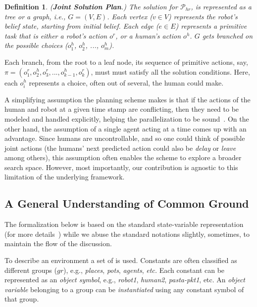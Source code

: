 \documentclass[letterpaper]{article} %
\newtheorem{definition}{Definition}
\begin{document}
\begin{definition} \label{def:joint-sol-plan}
(\textbf{Joint Solution Plan}.) 
{The solution for $\mathcal{P}_{hr}$, is represented as a tree or a graph, i.e., $G=(V,E)$. Each vertex ($v \in V$) represents the robot's belief state, starting from initial belief. Each edge ($e \in E$) represents a primitive task that is either a robot's action $o^{r}$, or a human's action $o^{h}$. $G$ gets branched on the possible choices ($o^{h}_1$, $o^{h}_2$, ..., $o^{h}_m$). 
}  
\end{definition}

Each branch, from the root to a leaf node, its sequence of primitive actions, say,  $\pi=(o_1^r,o_2^h,o_3^r,...,o_{k-1}^h,o_k^r)$, must must satisfy all the solution conditions. 
Here, each $o_i^h$ represents a choice, often out of several, the human could make.

A simplifying assumption the planning scheme makes is that if the actions of the human and robot at a given time stamp are conflicting, then they need to be modeled and handled explicitly, helping the parallelization to be sound~\cite{CrosbyJR14,ShekharB20}.
On the other hand, the assumption of a single agent acting at a time comes up with an advantage. Since humans are uncontrollable, and so one could think of possible joint actions (the humans' next predicted action could also be \textit{delay} or \textit{leave} among others), this assumption often enables the scheme to explore a broader search space. 
However, most importantly, our contribution is agnostic to this limitation of the underlying framework.

\subsection{A General Understanding of Common Ground}
The formalization below is based on the standard state-variable representation (for more details~\cite{naubooks0014222}) while we abuse the standard notations slightly, sometimes, to maintain the flow of the discussion.

To describe an environment a set of  is used. 
Constants are often classified as different groups ($gr$), e.g., \textit{places}, \textit{pots}, \textit{agents}, \textit{etc.} 
Each constant can be represented as an \textit{object symbol}, e.g., \textit{robot1}, \textit{human2}, \textit{pasta-pkt1}, etc. 
An \textit{object variable} belonging to a group can be \textit{instantiated} using any constant symbol of that group.
\end{document}

